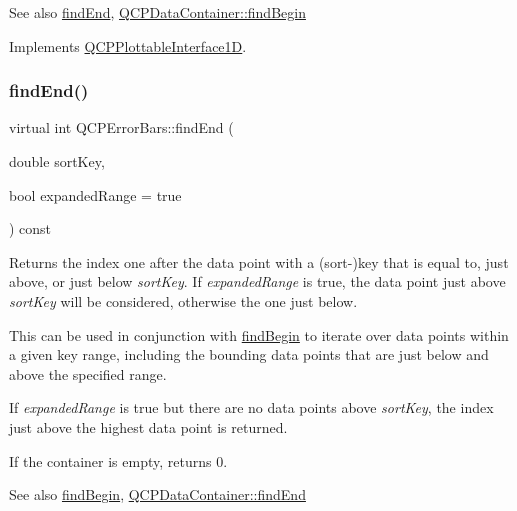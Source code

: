 \begin{DoxySeeAlso}{See also}
\hyperlink{class_q_c_p_error_bars_a64629f13bb290d41dd8f1b37346bfdd4}{find\+End}, \hyperlink{class_q_c_p_data_container_a2ad8a5399072d99a242d3a6d2d7e278a}{Q\+C\+P\+Data\+Container\+::find\+Begin} 
\end{DoxySeeAlso}


Implements \hyperlink{class_q_c_p_plottable_interface1_d_a5b95783271306a4de97be54eac1e7d13}{Q\+C\+P\+Plottable\+Interface1D}.

\mbox{\label{class_q_c_p_error_bars_a5a529f3a9e71b6c29f8a0397d570489e}} 
\subsubsection{\texorpdfstring{find\+End()}{findEnd()}\hspace{0.1cm}{\footnotesize\ttfamily [1/2]}}
{\footnotesize\ttfamily virtual int Q\+C\+P\+Error\+Bars\+::find\+End (\begin{DoxyParamCaption}\item[{double}]{sort\+Key,  }\item[{bool}]{expanded\+Range = {\ttfamily true} }\end{DoxyParamCaption}) const\hspace{0.3cm}{\ttfamily [virtual]}}

Returns the index one after the data point with a (sort-\/)key that is equal to, just above, or just below {\itshape sort\+Key}. If {\itshape expanded\+Range} is true, the data point just above {\itshape sort\+Key} will be considered, otherwise the one just below.

This can be used in conjunction with \hyperlink{class_q_c_p_error_bars_a5c74b510f1d7254263ec18cd3a359a07}{find\+Begin} to iterate over data points within a given key range, including the bounding data points that are just below and above the specified range.

If {\itshape expanded\+Range} is true but there are no data points above {\itshape sort\+Key}, the index just above the highest data point is returned.

If the container is empty, returns 0.

\begin{DoxySeeAlso}{See also}
\hyperlink{class_q_c_p_error_bars_a5c74b510f1d7254263ec18cd3a359a07}{find\+Begin}, \hyperlink{class_q_c_p_data_container_afb8b8f23cc2b7234a793a25ce79fe48f}{Q\+C\+P\+Data\+Container\+::find\+End} 
\end{DoxySeeAlso}


